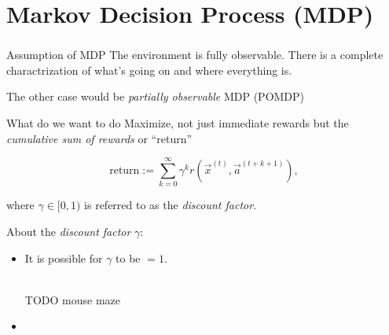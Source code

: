 \section{Markov Decision Process (MDP)}




\begin{frame}\frametitle{\secname}

\begin{block}{Assumption of MDP}
The environment is fully observable. There is a complete charactrization of what's going on and where everything is.
\end{block}

The other case would be \emph{partially observable} MDP (POMDP)

\begin{block}{What do we want to do}
Maximize, not just immediate rewards but the \emph{cumulative sum of rewards} or ``return''

\begin{equation}
\text{return
} := \sum_{k=0}^{\infty} \gamma^k r(\vec x^{(t)}, \vec a^{(t+k+1)}),
\end{equation}

where $\gamma \in \lbrack0,1)$ is referred to as the \emph{discount factor}.
 
\end{block}

About the \emph{discount factor} $\gamma$:

\begin{itemize}
\item It is possible for $\gamma$ to be $=1$.\\

\\


TODO mouse maze

\item {}\\


\end{itemize}
\end{frame}
